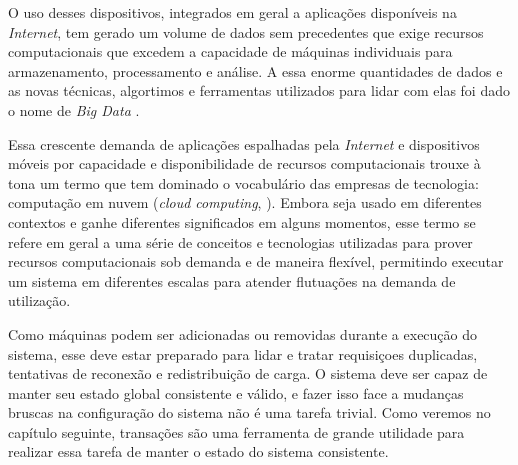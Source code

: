 \documentclass[11pt,twoside,a4paper]{book}
\begin{document}
O uso desses dispositivos, integrados em geral a aplicações disponíveis na \emph{Internet}, tem gerado um volume de dados sem precedentes que exige recursos computacionais que excedem a capacidade de máquinas individuais para armazenamento, processamento e análise. A essa enorme quantidades de dados e as novas técnicas, algortimos e ferramentas utilizados para lidar com elas foi dado o nome de \emph{Big Data} \cite{big_data}.

Essa crescente demanda de aplicações espalhadas pela \emph{Internet} e dispositivos móveis por capacidade e disponibilidade de recursos computacionais trouxe à tona um termo que tem dominado o vocabulário das empresas de tecnologia: computação em nuvem (\emph{cloud computing}, \cite{cloud}). Embora seja usado em diferentes contextos e ganhe diferentes significados em alguns momentos, esse termo se refere em geral a uma série de conceitos e tecnologias utilizadas para prover recursos computacionais sob demanda e de maneira flexível, permitindo executar um sistema em diferentes escalas para atender flutuações na demanda de utilização. 

Como máquinas podem ser adicionadas ou removidas durante a execução do sistema, esse deve estar preparado para lidar e tratar requisiçoes duplicadas, tentativas de reconexão e redistribuição de carga. O sistema deve ser capaz de manter seu estado global consistente e válido, e fazer isso face a mudanças bruscas na configuração do sistema não é uma tarefa trivial. Como veremos no capítulo seguinte, transações são uma ferramenta de grande utilidade para realizar essa tarefa de manter o estado do sistema consistente. 



\end{document}
